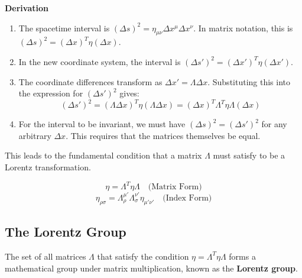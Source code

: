 \documentclass[11pt, a4paper]{report}
\begin{document}
\textbf{Derivation}
\begin{enumerate}
    \item The spacetime interval is $(\Delta s)^2 = \eta_{\mu\nu} \Delta x^\mu \Delta x^\nu$. In matrix notation, this is $(\Delta s)^2 = (\Delta x)^T \eta (\Delta x)$.
    \item In the new coordinate system, the interval is $(\Delta s')^2 = (\Delta x')^T \eta (\Delta x')$.
    \item The coordinate differences transform as $\Delta x' = \Lambda \Delta x$. Substituting this into the expression for $(\Delta s')^2$ gives:
    \[
        (\Delta s')^2 = (\Lambda \Delta x)^T \eta (\Lambda \Delta x) = (\Delta x)^T \Lambda^T \eta \Lambda (\Delta x)
    \]
    \item For the interval to be invariant, we must have $(\Delta s)^2 = (\Delta s')^2$ for any arbitrary $\Delta x$. This requires that the matrices themselves be equal.
\end{enumerate}
This leads to the fundamental condition that a matrix $\Lambda$ must satisfy to be a Lorentz transformation.

\begin{equation}\label{eq:lorentz-condition}
    \eta = \Lambda^T \eta \Lambda \quad \text{(Matrix Form)}
\end{equation}
\begin{equation}
    \eta_{\rho\sigma} = \Lambda^{\mu'}_\rho \Lambda^{\nu'}_\sigma \eta_{\mu'\nu'} \quad \text{(Index Form)}
\end{equation}

\subsection*{The Lorentz Group}

The set of all matrices $\Lambda$ that satisfy the condition $\eta = \Lambda^T \eta \Lambda$ forms a mathematical group under matrix multiplication, known as the \textbf{Lorentz group}.
\end{document}
